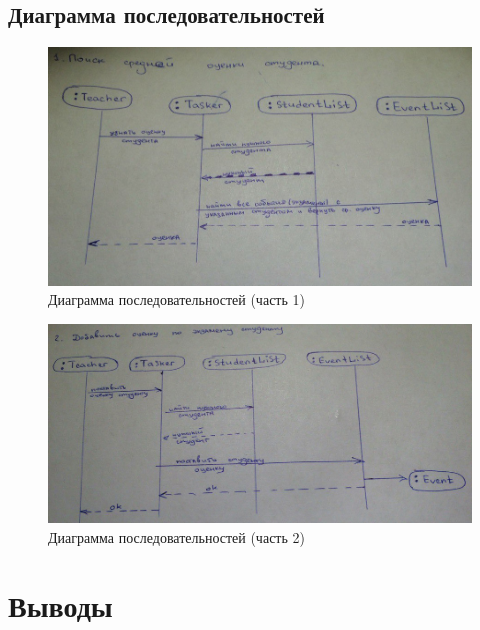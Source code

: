 \documentclass[utf8x, 12pt]{G7-32}
\begin{document}
\newpage
\section{Диаграмма последовательностей}

\begin{figure}[hhh!]
	\begin{center}
		\includegraphics[width=15cm]{img/diagPo1}
	\end{center}
	\vspace{-5mm}\caption{Диаграмма последовательностей (часть 1)}
\end{figure}

\begin{figure}[hhh!]
	\begin{center}
		\includegraphics[width=15cm]{img/diagPo2}
	\end{center}
	\vspace{-5mm}\caption{Диаграмма последовательностей (часть 2)}
\end{figure}

\chapter{Выводы}
\end{document}

